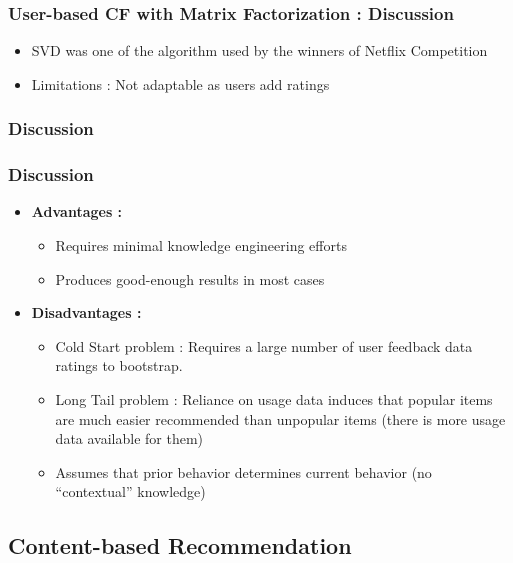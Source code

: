 \documentclass[10pt,handout,english]{beamer}
\begin{document}
			\begin{frame}
			\frametitle{User-based CF with Matrix Factorization : Discussion}
				\begin{itemize}
					\item SVD was one of the algorithm used by the winners of Netflix Competition
					\item Limitations : Not adaptable as users add ratings
				\end{itemize}

			\end{frame}

			\subsubsection{Discussion}
			\begin{frame}
			\frametitle{Discussion}
				\begin{itemize}
					\item \textbf{Advantages :}
						\begin{itemize}
							\item Requires minimal knowledge engineering efforts
							\item Produces good-enough results in most cases
						\end{itemize}
					\item \textbf{Disadvantages :}
						\begin{itemize}
							\item Cold Start problem : Requires a large number of user feedback data ratings to bootstrap.
							\item Long Tail problem : Reliance on usage data induces that popular items are much easier recommended than unpopular items (there is more usage data available for them)
							\item Assumes that prior behavior determines current behavior (no ``contextual'' knowledge)
						\end{itemize}
				\end{itemize}

			\end{frame}

		\subsection{Content-based Recommendation}
\end{document}
